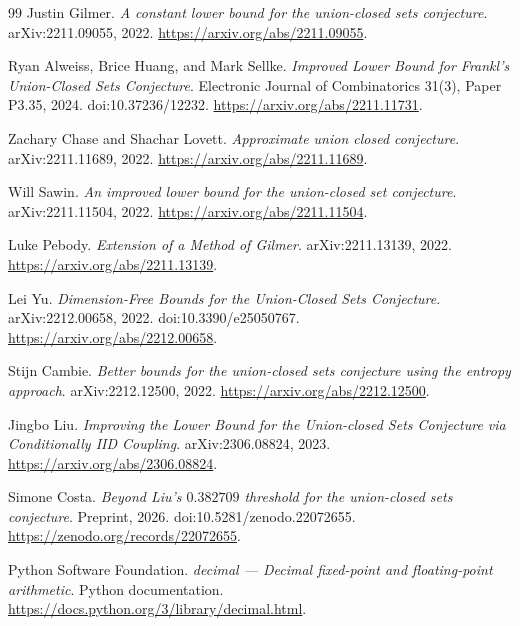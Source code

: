 \documentclass[11pt]{article}
\theoremstyle{remark}
\begin{document}
\clearpage
\begin{thebibliography}{99}
Justin Gilmer.
\emph{A constant lower bound for the union-closed sets conjecture}.
arXiv:2211.09055, 2022.
\url{https://arxiv.org/abs/2211.09055}.

Ryan Alweiss, Brice Huang, and Mark Sellke.
\emph{Improved Lower Bound for Frankl's Union-Closed Sets Conjecture}.
Electronic Journal of Combinatorics 31(3), Paper P3.35, 2024.
doi:10.37236/12232.
\url{https://arxiv.org/abs/2211.11731}.

Zachary Chase and Shachar Lovett.
\emph{Approximate union closed conjecture}.
arXiv:2211.11689, 2022.
\url{https://arxiv.org/abs/2211.11689}.

Will Sawin.
\emph{An improved lower bound for the union-closed set conjecture}.
arXiv:2211.11504, 2022.
\url{https://arxiv.org/abs/2211.11504}.

Luke Pebody.
\emph{Extension of a Method of Gilmer}.
arXiv:2211.13139, 2022.
\url{https://arxiv.org/abs/2211.13139}.

Lei Yu.
\emph{Dimension-Free Bounds for the Union-Closed Sets Conjecture}.
arXiv:2212.00658, 2022.
doi:10.3390/e25050767.
\url{https://arxiv.org/abs/2212.00658}.

Stijn Cambie.
\emph{Better bounds for the union-closed sets conjecture using the entropy approach}.
arXiv:2212.12500, 2022.
\url{https://arxiv.org/abs/2212.12500}.


Jingbo Liu.
\emph{Improving the Lower Bound for the Union-closed Sets Conjecture
via Conditionally IID Coupling}.
arXiv:2306.08824, 2023.
\url{https://arxiv.org/abs/2306.08824}.

Simone Costa.
\emph{Beyond Liu's \(0.382709\) threshold for the union-closed sets conjecture}.
Preprint, 2026.
doi:10.5281/zenodo.22072655.
\url{https://zenodo.org/records/22072655}.

Python Software Foundation.
\emph{decimal --- Decimal fixed-point and floating-point arithmetic}.
Python documentation.
\url{https://docs.python.org/3/library/decimal.html}.
\end{thebibliography}
\end{document}
